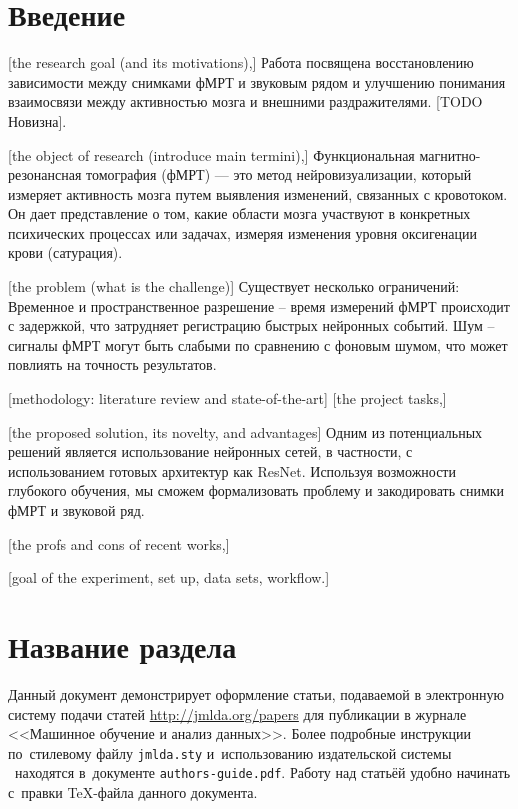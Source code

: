 \documentclass[12pt, twoside]{article}
\begin{document}

\maketitle
\linenumbers

\section{Введение}

[the research goal (and its motivations),]
Работа посвящена восстановлению зависимости между снимками фМРТ
и звуковым рядом и улучшению понимания взаимосвязи между активностью мозга и внешними раздражителями. [TODO Новизна].

[the object of research (introduce main termini),]
Функциональная магнитно-резонансная томография (фМРТ) — это метод нейровизуализации, который измеряет активность мозга путем выявления изменений, связанных с кровотоком. Он дает представление о том, какие области мозга участвуют в конкретных психических процессах или задачах, измеряя изменения уровня оксигенации крови (сатурация). 

[the problem (what is the challenge)]
Существует несколько ограничений:  Временное и пространственное разрешение -- время измерений фМРТ происходит с задержкой, что затрудняет регистрацию быстрых нейронных событий. Шум -- сигналы фМРТ могут быть слабыми по сравнению с фоновым шумом, что может повлиять на точность результатов.


[methodology: literature review and state-of-the-art]
[the project tasks,]


[the proposed solution, its novelty, and advantages]
Одним из потенциальных решений является использование нейронных сетей, в частности, с использованием готовых архитектур как ResNet. Используя возможности глубокого обучения, мы сможем формализовать проблему и закодировать снимки фМРТ и звуковой ряд. 

[the profs and cons of recent works,]



[goal of the experiment, set up, data sets, workflow.]







\section{Название раздела}
Данный документ демонстрирует оформление статьи,
подаваемой в электронную систему подачи статей \url{http://jmlda.org/papers} для публикации в журнале <<Машинное обучение и анализ данных>>.
Более подробные инструкции по~стилевому файлу \texttt{jmlda.sty} и~использованию издательской системы \LaTeXe\
находятся в~документе \texttt{authors-guide.pdf}.
Работу над статьёй удобно начинать с~правки \TeX-файла данного документа.
\end{document}
